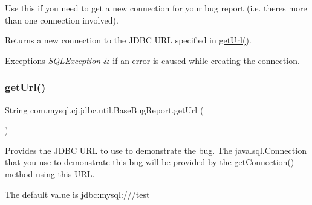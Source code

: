 Use this if you need to get a new connection for your bug report (i.\+e. there\textquotesingle{}s more than one connection involved).

\begin{DoxyReturn}{Returns}
a new connection to the J\+D\+BC U\+RL specified in \mbox{\hyperlink{classcom_1_1mysql_1_1cj_1_1jdbc_1_1util_1_1_base_bug_report_af253a8d960912715ba0cc0fe1766c4d6}{get\+Url()}}.
\end{DoxyReturn}

\begin{DoxyExceptions}{Exceptions}
{\em S\+Q\+L\+Exception} & if an error is caused while creating the connection. \\
\hline
\end{DoxyExceptions}
\mbox{\label{classcom_1_1mysql_1_1cj_1_1jdbc_1_1util_1_1_base_bug_report_af253a8d960912715ba0cc0fe1766c4d6}} 
\subsubsection{\texorpdfstring{get\+Url()}{getUrl()}}
{\footnotesize\ttfamily String com.\+mysql.\+cj.\+jdbc.\+util.\+Base\+Bug\+Report.\+get\+Url (\begin{DoxyParamCaption}{ }\end{DoxyParamCaption})}

Provides the J\+D\+BC U\+RL to use to demonstrate the bug. The java.\+sql.\+Connection that you use to demonstrate this bug will be provided by the \mbox{\hyperlink{classcom_1_1mysql_1_1cj_1_1jdbc_1_1util_1_1_base_bug_report_aef144ede71b00b26e1435e42314192c9}{get\+Connection()}} method using this U\+RL.

The default value is \textquotesingle{}jdbc\+:mysql\+:///test\textquotesingle{} \mbox{\label{classcom_1_1mysql_1_1cj_1_1jdbc_1_1util_1_1_base_bug_report_aa9c59d5f6ff687784bd96bebd5e3dc87}} 
